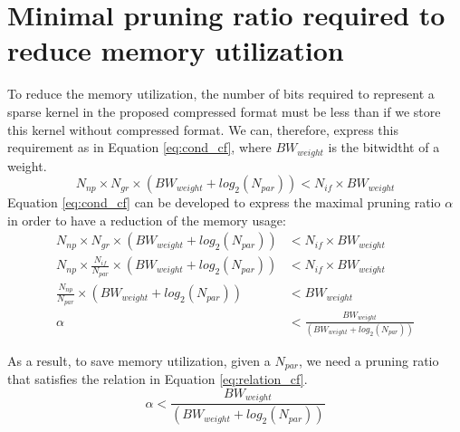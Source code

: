 \chapter{Minimal pruning ratio required to reduce memory utilization} \label{appendix:cf}
%
To reduce the memory utilization, the number of bits required to represent a sparse kernel in the proposed compressed format must be less than if we store this kernel without compressed format. We can, therefore, express this requirement as in Equation \eqref{eq:cond_cf}, where $BW_{weight}$ is the bitwidtht of a weight.
\begin{equation}
    N_{np} \times N_{gr} \times (BW_{weight} + log_2(N_{par})) < N_{if} \times BW_{weight}
    \label{eq:cond_cf}
\end{equation}
Equation \eqref{eq:cond_cf} can be developed to express the maximal pruning ratio $\alpha$ in order to have a reduction of the memory usage:
\begin{align*}
    N_{np} \times N_{gr} \times (BW_{weight} + log_2(N_{par})) &< N_{if} \times BW_{weight} \\
    N_{np} \times \frac{N_{if}}{N_{par}} \times (BW_{weight} + log_2(N_{par})) &< N_{if} \times BW_{weight} \\
    \frac{N_{np}}{N_{par}} \times (BW_{weight} + log_2(N_{par})) &< BW_{weight} \\
    \alpha &< \frac{BW_{weight}}{(BW_{weight} + log_2(N_{par}))}
\end{align*}

As a result, to save memory utilization, given a $N_{par}$, we need a pruning ratio that satisfies the relation in Equation \ref{eq:relation_cf}.
\begin{equation}
    \alpha < \frac{BW_{weight}}{(BW_{weight} + log_2(N_{par}))}
    \label{eq:relation_cf}
\end{equation} 
\newpage